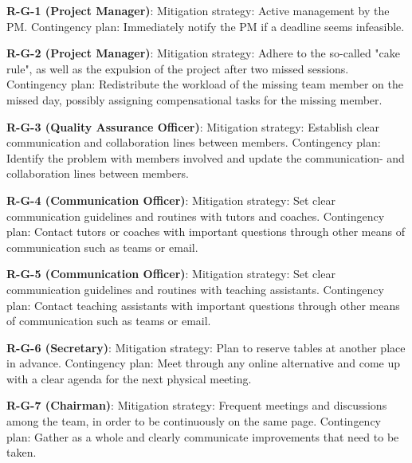 \textbf{R-G-1 (Project Manager)}:
\newline Mitigation strategy: Active management by the PM.
\newline Contingency plan: Immediately notify the PM if a deadline seems infeasible.


\textbf{R-G-2 (Project Manager)}:
\newline Mitigation strategy: Adhere to the so-called "cake rule", as well as the expulsion of the project after two missed sessions.
\newline Contingency plan: Redistribute the workload of the missing team member on the missed day, possibly assigning compensational tasks for the missing member.

\textbf{R-G-3 (Quality Assurance Officer)}:
\newline Mitigation strategy: Establish clear communication and collaboration lines between members.
\newline Contingency plan: Identify the problem with members involved and update the communication- and collaboration lines between members.

\textbf{R-G-4 (Communication Officer)}:
\newline Mitigation strategy: Set clear communication guidelines and routines with tutors and coaches.
\newline Contingency plan: Contact tutors or coaches with important questions through other means of communication such as teams or email.

\textbf{R-G-5 (Communication Officer)}:
\newline Mitigation strategy: Set clear communication guidelines and routines with teaching assistants.
\newline Contingency plan: Contact teaching assistants with important questions through other means of communication such as teams or email.

\textbf{R-G-6 (Secretary)}:
\newline Mitigation strategy: Plan to reserve tables at another place in advance.
\newline Contingency plan: Meet through any online alternative and come up with a clear agenda for the next physical meeting.

\textbf{R-G-7 (Chairman)}:
\newline Mitigation strategy: Frequent meetings and discussions among the team, in order to be continuously on the same page.
\newline Contingency plan: Gather as a whole and clearly communicate improvements that need to be taken.

